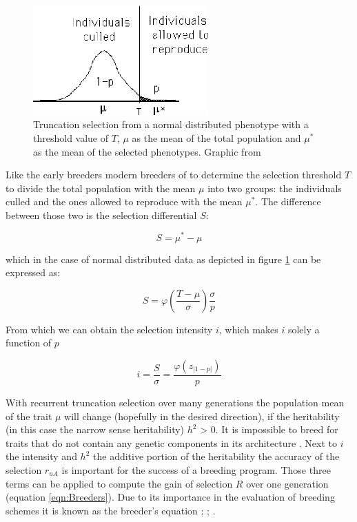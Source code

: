 \begin{figure}[H]
   \centering \includegraphics[height=.25\textheight, width=0.6\textwidth]{Figures/truncSel} \decoRule
   \caption[Truncation selection of a normal distributed phenotype]{Truncation selection from a normal distributed phenotype with a threshold value of $T$, $\mu$ as the mean of the total population and $\mu^{\ast}$ as the mean of the selected phenotypes. Graphic from \cite{walsh2018short}}
 \label{fig:trunSel}
\end{figure}


Like the early breeders modern breeders of to determine the selection threshold $T$ to divide the total population with the mean $\mu$ into two groups: the individuals culled and the ones allowed to reproduce with the mean $\mu^{\ast}$. The difference between those two is the selection differential $S$:

\begin{equation}
  S =  \mu^{\ast} - \mu
\label{eqn:S}
\end{equation}

which in the case of normal distributed data as depicted in figure \ref{fig:trunSel} can be expressed as:

\begin{equation}
S = \varphi (\frac{T - \mu}{\sigma}) \frac{\sigma}{p}
\end{equation}

From which we can obtain the selection intensity $i$, which makes $i$ solely a function of $p$ 

\begin{equation}
i = \frac{S}{\sigma} = \frac{\varphi (z_{|1-p|})}{p}
\end{equation}


With recurrent truncation selection over many generations the population mean of the trait $\mu$ will change
(hopefully in the desired direction), if the heritability (in this case the narrow sense heritability) $h^2$ >
0. It is impossible to breed for traits that do not contain any genetic components in its architecture
\cite{walsh2018}.  Next to $i$ the intensity and $h^2$ the additive portion of the heritability the accuracy
of the selection $r_{uA}$ is important for the success of a breeding program. Those three terms can be applied
to compute the gain of selection $R$ over one generation (equation \ref{eqn:Breeders}). Due to its importance
in the evaluation of breeding schemes it is known as the breeder's equation \cite{mousseau1987natural};
\cite{falconer1996}; \cite{kingsolver2001strength}.

